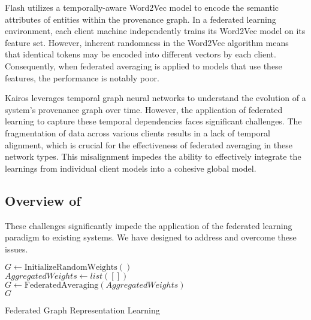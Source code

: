 Flash utilizes a temporally-aware Word2Vec model to encode the semantic attributes of entities within the provenance graph. In a federated learning environment, each client machine independently trains its Word2Vec model on its feature set. However, inherent randomness in the Word2Vec algorithm means that identical tokens may be encoded into different vectors by each client. Consequently, when federated averaging is applied to \gnn models that use these features, the performance is notably poor.

Kairos leverages temporal graph neural networks to understand the evolution of a system's provenance graph over time. However, the application of federated learning to capture these temporal dependencies faces significant challenges. The fragmentation of data across various clients results in a lack of temporal alignment, which is crucial for the effectiveness of federated averaging in these network types. This misalignment impedes the ability to effectively integrate the learnings from individual client models into a cohesive global model.


\subsection{Overview of \Sys}
These challenges significantly impede the application of the federated learning paradigm to existing systems. We have designed \Sys to address and overcome these issues. 

\begin{algorithm}[h]
    \scriptsize
    \DontPrintSemicolon
    \BlankLine
    $G \leftarrow \text{InitializeRandomWeights}()$\\
    \BlankLine
    $AggregatedWeights \leftarrow list([])$\\
    $G \leftarrow \text{FederatedAveraging}(AggregatedWeights)$\\
    \BlankLine
    \Return $G$\\
    \BlankLine
    \caption{Federated Graph Representation Learning}
    \label{alg:federated_learning}
  \end{algorithm}
  
